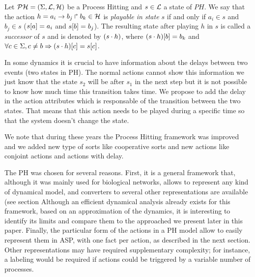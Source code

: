 \begin{definition} 
\label{def:playableAction}
Let $\mathcal{PH} = (\Sigma,\mathcal{L},\mathcal{H})$ be a Process Hitting and $s \in \mathcal{L}$ a state of $PH$.
We say that the action $h = a_i\rightarrow b_j\Rsh b_k \in \mathcal{H}$
is \emph{playable in state $s$} if and only if
$a_i \in s$ and $b_j \in s$ (\ie ${s[a]} = a_i$ and ${s[b]}=b_j$).
The resulting state after playing $h$ in $s$
is called a \emph{successor} of $s$ and
is denoted by $(s \cdot h)$,
where ${(s \cdot h)[b]} = b_k$ and
$\forall c \in \Sigma, c \neq b \Rightarrow {(s \cdot h)[c]}={s[c]}$.
\end{definition}

In some dynamics it is crucial to have information about the delays between two events (two states in PH). The normal actions cannot show this information we just know that the state $s_2$ will be after $s_1$ in the next step but it is not possible to know how much time this transition takes time. We propose to add the delay in the action attributes which is responsable of the transition between the two states. That means that this action needs to be played during a specific time so that the system doesn't change the state.

\begin{definition}
\label{def:TimedAction}

\end{definition}

We note that during these years the Process Hitting framework was improved and we added new type of sorts like cooperative sorts and new actions like conjoint actions and actions with delay.

The PH was chosen for several reasons.
First, it is a general framework that,
although it was mainly used for biological networks,
allows to represent any kind of dynamical model,
and converters to several other representations are available (see section%
Although an efficient dynamical analysis already exists for this framework,
based on an approximation of the dynamics,
it is interesting to identify its limits
and compare them to the approached we present later in this paper.
Finally, the particular form of the actions in a PH model allow
to easily represent them in ASP,
with one fact per action, as described in the next section.
Other representations may have required supplementary complexity;
for instance, a labeling would be required
if actions could be triggered by a variable number of processes.


